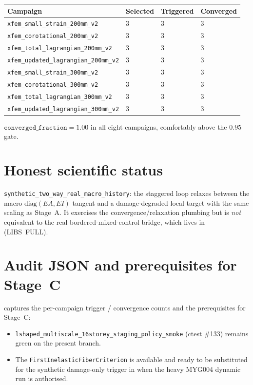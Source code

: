 \begin{center}
\begin{tabular}{llll}
\hline
Campaign & Selected & Triggered & Converged \\
\hline
\texttt{xfem\_small\_strain\_200mm\_v2}       & 3 & 3 & 3 \\
\texttt{xfem\_corotational\_200mm\_v2}        & 3 & 3 & 3 \\
\texttt{xfem\_total\_lagrangian\_200mm\_v2}   & 3 & 3 & 3 \\
\texttt{xfem\_updated\_lagrangian\_200mm\_v2} & 3 & 3 & 3 \\
\texttt{xfem\_small\_strain\_300mm\_v2}       & 3 & 3 & 3 \\
\texttt{xfem\_corotational\_300mm\_v2}        & 3 & 3 & 3 \\
\texttt{xfem\_total\_lagrangian\_300mm\_v2}   & 3 & 3 & 3 \\
\texttt{xfem\_updated\_lagrangian\_300mm\_v2} & 3 & 3 & 3 \\
\hline
\end{tabular}
\end{center}

\noindent
$\texttt{converged\_fraction} = 1.00$ in all eight campaigns, comfortably
above the $0.95$ gate.

\section{Honest scientific status}

\texttt{synthetic\_two\_way\_real\_macro\_history}: the staggered loop
relaxes between the macro $\mathrm{diag}(EA, EI)$ tangent and a
damage-degraded local target with the same scaling as Stage~A. It
exercises the convergence/relaxation plumbing but is \emph{not}
equivalent to the real bordered-mixed-control bridge, which lives in
 (LIBS~FULL).

\section{Audit JSON and prerequisites for Stage~C}

captures the per-campaign trigger / convergence counts and the
prerequisites for Stage~C:

\begin{itemize}
  \item \texttt{lshaped\_multiscale\_16storey\_staging\_policy\_smoke}
        (ctest \#133) remains green on the present branch.
  \item The \texttt{FirstInelasticFiberCriterion} is available and ready
        to be substituted for the synthetic damage-only trigger in
         when the heavy
        MYG004 dynamic run is authorised.
\end{itemize}

